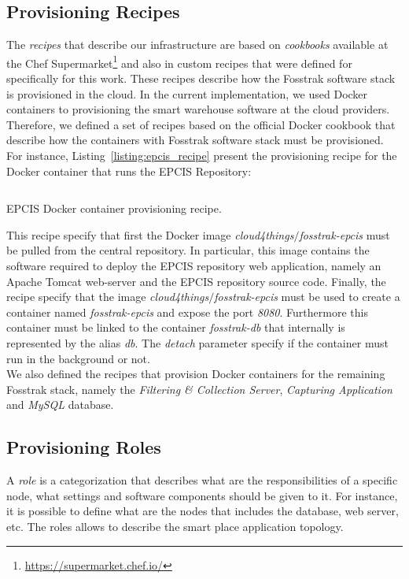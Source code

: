 \subsection{Provisioning Recipes}
\label{sub:recipes}
The \textit{recipes} that describe our infrastructure are based on \textit{cookbooks} available at the
Chef Supermarket\footnote{\url{https://supermarket.chef.io/}} and also in custom recipes that
were defined for specifically for this work. These recipes describe how the Fosstrak software
stack is provisioned in the cloud. In the current implementation, we used Docker containers to provisioning
the smart warehouse software at the cloud providers. Therefore, we defined a set of recipes
based on the official Docker cookbook that describe how the containers with Fosstrak software
stack must be provisioned. For instance, Listing~\ref{listing:epcis_recipe} present the provisioning
recipe for the Docker container that runs the \gls{EPCIS} Repository:

\begin{listing}
  \inputminted[frame=lines,
                 framesep=3mm,
                 linenos=true,
                 xleftmargin=21pt,
                 tabsize=4]{ruby}{./listings/epcis_recipe.rb}
  \caption{EPCIS Docker container provisioning recipe.}
  \label{listing:epcis_recipe}
\end{listing}

This recipe specify that first the Docker image \textit{cloud4things$/$fosstrak-epcis} must be pulled
from the central repository. In particular, this image contains the software required to deploy the
EPCIS repository web application, namely an Apache Tomcat web-server and the EPCIS repository
source code. Finally, the recipe specify that the image \textit{cloud4things$/$fosstrak-epcis} must
be used to create a container named \textit{fosstrak-epcis} and expose the port \textit{8080}.
Furthermore this container must be linked to the container \textit{fosstrak-db} that internally is
represented by the alias \textit{db}. The \textit{detach} parameter specify if the container must
run in the background or not.\\

We also defined the recipes that provision Docker containers for the remaining Fosstrak
stack, namely the \textit{Filtering \& Collection Server}, \textit{Capturing Application} and
\textit{MySQL} database.

\subsection{Provisioning Roles}
\label{sub:provisioning_roles}
A \textit{role} is a categorization that describes what are the responsibilities of a specific
node, what settings and software components should be given to it. For instance, it is possible
to define what are the nodes that includes the database, web server, etc. The roles allows to describe
the smart place application topology.\\

